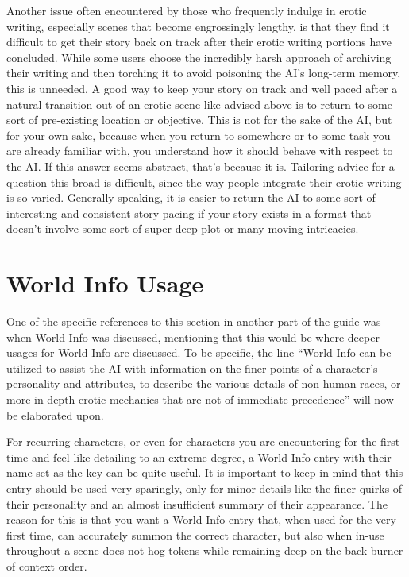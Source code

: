 \documentclass[Source-main.tex]{subfiles}
\begin{document}
Another issue often encountered by those who frequently indulge in erotic writing, especially scenes that become engrossingly lengthy, is that they find it difficult to get their story back on track after their erotic writing portions have concluded.
While some users choose the incredibly harsh approach of archiving their writing and then torching it to avoid poisoning the AI’s long-term memory, this is unneeded.
A good way to keep your story on track and well paced after a natural transition out of an erotic scene like advised above is to return to some sort of pre-existing location or objective.
This is not for the sake of the AI, but for your own sake, because when you return to somewhere or to some task you are already familiar with, you understand how it should behave with respect to the AI.
If this answer seems abstract, that’s because it is.
Tailoring advice for a question this broad is difficult, since the way people integrate their erotic writing is so varied.
Generally speaking, it is easier to return the AI to some sort of interesting and consistent story pacing if your story exists in a format that doesn’t involve some sort of super-deep plot or many moving intricacies.

\section{World Info Usage}
\label{sec:wiusage}

One of the specific references to this section in another part of the guide was when World Info was discussed, mentioning that this would be where deeper usages for World Info are discussed.
To be specific, the line “World Info can be utilized to assist the AI with information on the finer points of a character’s personality and attributes, to describe the various details of non-human races, or more in-depth erotic mechanics that are not of immediate precedence” will now be elaborated upon.

For recurring characters, or even for characters you are encountering for the first time and feel like detailing to an extreme degree, a World Info entry with their name set as the key can be quite useful.
It is important to keep in mind that this entry should be used very sparingly, only for minor details like the finer quirks of their personality and an almost insufficient summary of their appearance.
The reason for this is that you want a World Info entry that, when used for the very first time, can accurately summon the correct character, but also when in-use throughout a scene does not hog tokens while remaining deep on the back burner of context order.
\end{document}
